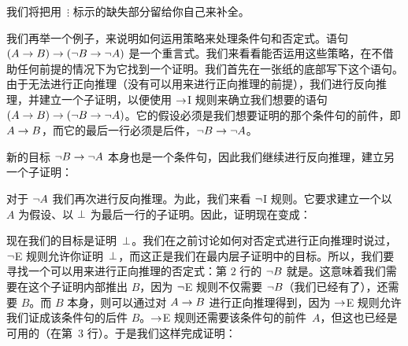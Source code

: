我们将把用~$\vdots$ 标示的缺失部分留给你自己来补全。

我们再举一个例子，来说明如何运用策略来处理条件句和否定式。语句 $(A \rightarrow B) \rightarrow
(\neg B \rightarrow \neg A)$ 是一个重言式。我们来看看能否运用这些策略，在不借助任何前提的情况下为它找到一个证明。我们首先在一张纸的底部写下这个语句。由于无法进行正向推理（没有可以用来进行正向推理的前提），我们进行反向推理，并建立一个子证明，以便使用 $\rightarrow$I 规则来确立我们想要的语句 $(A
\rightarrow B) \rightarrow (\neg B \rightarrow \neg A)$。它的假设必须是我们想要证明的那个条件句的前件，即 $A \rightarrow B$，而它的最后一行必须是后件，$\neg B \rightarrow \neg A$。


\begin{fitchproof}
\open
{}\AS
\ellipsesline
{}
\close
{}
\end{fitchproof}


新的目标 $\neg B \rightarrow \neg A$ 本身也是一个条件句，因此我们继续进行反向推理，建立另一个子证明：


\begin{fitchproof}
	\open
	\AS
	\open
	\AS
	\ellipsesline
	\close
	\close
\end{fitchproof}


对于 $\neg A$ 我们再次进行反向推理。为此，我们来看 $\neg$I 规则。它要求建立一个以 $A$ 为假设、以 $\bot$ 为最后一行的子证明。因此，证明现在变成：


\begin{fitchproof}
	\open
	\AS
	\open
	\AS
	\open{}
	\ellipsesline
	\close
	\close
	\close
\end{fitchproof}


现在我们的目标是证明~$\bot$。我们在之前讨论如何对否定式进行正向推理时说过，$\neg$E 规则允许你证明~$\bot$，而这正是我们在最内层子证明中的目标。所以，我们要寻找一个可以用来进行正向推理的否定式：第 $2$ 行的 $\neg B$ 就是。这意味着我们需要在这个子证明内部推出 $B$，因为 $\neg$E 规则不仅需要 $\neg B$（我们已经有了），还需要 $B$。而 $B$ 本身，则可以通过对 $A \rightarrow B$ 进行正向推理得到，因为 $\rightarrow$E 规则允许我们证成该条件句的后件 $B$。$\rightarrow$E 规则还需要该条件句的前件~$A$，但这也已经是可用的（在第~$3$ 行）。于是我们这样完成证明：


